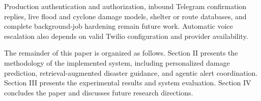 Production authentication and authorization, inbound Telegram confirmation replies, live flood and cyclone damage models, shelter or route databases, and complete background-job hardening remain future work. Automatic voice escalation also depends on valid Twilio configuration and provider availability.

The remainder of this paper is organized as follows. Section II presents the methodology of the implemented system, including personalized damage prediction, retrieval-augmented disaster guidance, and agentic alert coordination. Section III presents the experimental results and system evaluation. Section IV concludes the paper and discusses future research directions.

